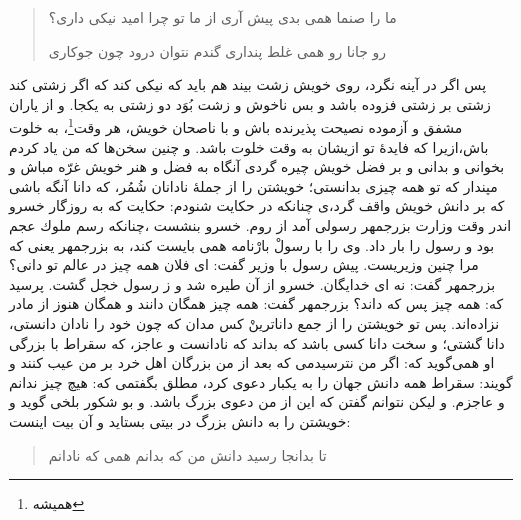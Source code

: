 \begin{quote}
\centering
ما را صنما همى بدى پيش آرى\quad \quad 
از ما تو چرا اميد نيكى دارى‌؟


رو جانا رو همى غلط پندارى \quad \quad
گندم نتوان درود چون جوكارى
\end{quote}

پس اگر در آينه نگرد، روى خويش زشت بيند هم بايد كه نيكى كند كه اگر زشتى كند زشتى بر زشتى فزوده باشد و بس ناخوش و زشت بُوَد دو زشتى به يكجا. و از ياران مشفق و آزموده نصيحت پذيرنده باش و با ناصحان خويش، هر وقت\footnote{همیشه}، به خلوت باش،ازيرا كه فايدۀ تو ازيشان به وقت خلوت باشد. و چنين سخن‌ها كه من ياد كردم بخوانى و بدانى و بر فضل خويش چيره گردى آنگاه به فضل و هنر خويش غرّه مباش و مپندار كه تو همه چيزى بدانستى؛ خويشتن را از جملۀ نادانان شُمُر، كه دانا آنگه باشى كه بر دانش خويش واقف گرد،ى چنانكه در حكايت شنودم: حكايت كه به روزگار خسرو اندر وقت وزارت بزرجمهر رسولى آمد از روم. خسرو بنشست ،چنانكه رسم ملوك عجم بود و رسول را بار داد. وى را با رسولْ بارْنامه همى بايست كند، به بزرجمهر يعنى كه مرا چنين وزيريست. پيش رسول با وزير گفت: اى فلان همه چيز در عالم تو دانى‌؟ بزرجمهر گفت: نه اى خدايگان. خسرو از آن طيره شد و ز رسول خجل گشت. پرسيد كه: همه چيز پس كه داند؟ بزرجمهر گفت: همه چيز همگان دانند و همگان هنوز از مادر نزاده‌اند. پس تو خويشتن را از جمع داناترينْ كس مدان كه چون خود را نادان دانستى، دانا گشتى؛ و سخت دانا كسى باشد كه بداند كه نادانست و عاجز، كه سقراط با بزرگى او همى‌گويد كه: اگر من نترسيدمى كه بعد از من بزرگان اهل خرد بر من عيب كنند و گويند: سقراط همه دانش جهان را به يكبار دعوى كرد، مطلق بگفتمى كه: هيچ چيز ندانم و عاجزم. و ليكن نتوانم گفتن كه اين از من دعوى بزرگ باشد. و بو شكور بلخى گويد و خويشتن را به دانش بزرگ در بيتى بستايد و آن بيت اينست:

\begin{quote}
\centering
تا بدانجا رسيد دانش من \quad \quad
كه بدانم همى كه نادانم
\end{quote}



